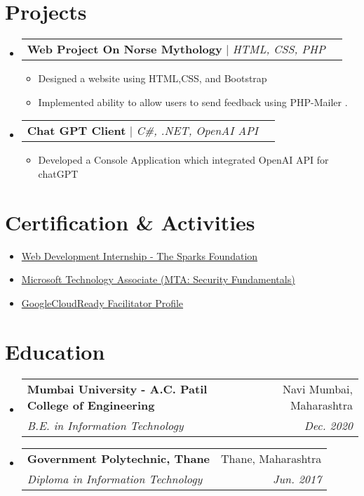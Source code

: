 \documentclass[letterpaper,11pt]{article}
\makeatletter
\newcommand{\resumeItem}[1]{
  \item\small{
    {#1 \vspace{-2pt}}
  }
}
\newcommand{\resumeSubheading}[4]{
  \vspace{-2pt}\item
    \begin{tabular*}{0.97\textwidth}[t]{l@{\extracolsep{\fill}}r}
      \textbf{#1} & #2 \\
      \textit{\small#3} & \textit{\small #4} \\
    \end{tabular*}\vspace{-7pt}
}
\newcommand{\resumeProjectHeading}[2]{
    \item
    \begin{tabular*}{0.97\textwidth}{l@{\extracolsep{\fill}}r}
      \small#1 & #2 \\
    \end{tabular*}\vspace{-7pt}
}
\newcommand{\resumeSubHeadingListStart}{\begin{itemize}[leftmargin=0.15in, label={}]}
\newcommand{\resumeSubHeadingListEnd}{\end{itemize}}
\newcommand{\resumeItemListStart}{\begin{itemize}}
\newcommand{\resumeItemListEnd}{\end{itemize}\vspace{-5pt}}
\makeatother
\begin{document}
\section{Projects}
    \resumeSubHeadingListStart
      \resumeProjectHeading
          {\textbf{Web Project On Norse Mythology} $|$ \emph{HTML, CSS, PHP}}{}
          \resumeItemListStart
            \resumeItem{Designed a website using HTML,CSS, and Bootstrap}
            \resumeItem{Implemented ability to allow users to send feedback using PHP-Mailer .}
          \resumeItemListEnd
      \resumeProjectHeading
          {\textbf{Chat GPT Client } $|$ \emph{C\#, .NET, OpenAI API}}{}
          \resumeItemListStart
            \resumeItem{Developed a Console Application which integrated OpenAI API for chatGPT }
          \resumeItemListEnd
    \resumeSubHeadingListEnd
\section{Certification \& Activities}
    \begin{itemize}
            \resumeItem{\href{https://drive.google.com/file/d/1Lpkbt5iVnXtadE8H2wnr1fBPywnXntYY/view?usp=sharing}{Web Development Internship - The Sparks Foundation}}
            \resumeItem{\href{https://www.youracclaim.com/badges/4a36f993-4157-4684-b65b-b9fb2c14d9bb}{Microsoft Technology Associate (MTA: Security Fundamentals)}}
            \resumeItem{\href{https://www.cloudskillsboost.google/public_profiles/d451f106-d88a-4502-87c2-182a85196922}{GoogleCloudReady Facilitator Profile}}
    \end{itemize}

\section{Education}
  \resumeSubHeadingListStart
    \resumeSubheading
      {Mumbai University  - A.C. Patil College of Engineering}{Navi Mumbai, Maharashtra}
      {B.E. in Information Technology }{Dec. 2020}
    \resumeSubheading
      {Government Polytechnic, Thane }{Thane, Maharashtra}
      {Diploma in Information Technology}{Jun. 2017}
  \resumeSubHeadingListEnd
\end{document}
